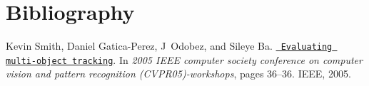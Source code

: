 \chapter{Bibliography}
\hypertarget{citelist}{}\label{citelist}

\begin{DoxyDescription}
\item[\label{citelist_CITEREF_evaluation}%
\Hypertarget{citelist_CITEREF_evaluation}%
\mbox{[}1\mbox{]}]Kevin Smith, Daniel Gatica-\/\+Perez, J~Odobez, and Sileye Ba. \href{https://www.idiap.ch/~odobez/publications/SmithGaticaOdobezBa-cvpr-eemcv05.pdf}{\texttt{ Evaluating multi-\/object tracking}}. In {\itshape 2005 IEEE computer society conference on computer vision and pattern recognition (CVPR\textquotesingle{}05)-\/workshops}, pages 36--36. IEEE, 2005.


\end{DoxyDescription}
